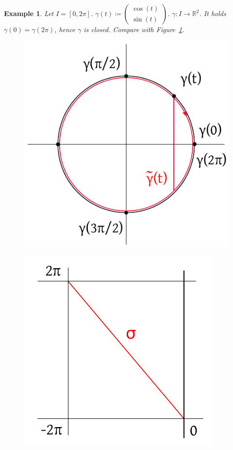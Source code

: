 \documentclass{article}
\newtheorem{example}{Example}  \numberwithin{example}{section}
\begin{document}
\begin{example}
  \label{exx}
  Let $I = [0,2\pi]$. $\gamma(t) \coloneqq \begin{pmatrix} \cos(t) \\ \sin(t) \end{pmatrix}$. $\gamma: I \to \mathbb R^2$.
  It holds $\gamma(0) = \gamma(2\pi)$, hence $\gamma$ is closed. Compare with Figure~\ref{img:ex1}.

  \begin{figure}[p]
    \begin{minipage}{.5\textwidth}
      \centering
      \includegraphics[width=.9\linewidth]{img/52a_ex.pdf}
      \label{img:ex1}
    \end{minipage}
    \begin{minipage}{.5\textwidth}
      \centering
      \includegraphics[width=.9\linewidth]{img/52b_ex.pdf}

\end{minipage}
\end{figure}
\end{example}
\end{document}
